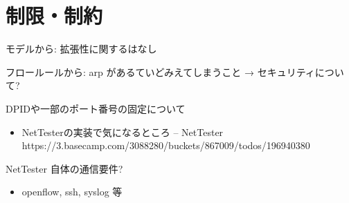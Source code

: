 \section{制限・制約}

モデルから: 拡張性に関するはなし

フロールールから: arp があるていどみえてしまうこと → セキュリティについて?

DPIDや一部のポート番号の固定について
\begin{itemize}
 \item NetTesterの実装で気になるところ – NetTester https://3.basecamp.com/3088280/buckets/867009/todos/196940380
\end{itemize}

NetTester 自体の通信要件?
\begin{itemize}
 \item openflow, ssh, syslog 等
\end{itemize}


